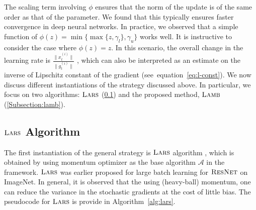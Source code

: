 \documentclass{article} \usepackage{iclr2020_conference,times}
\def\eqref#1{equation~\ref{#1}}
\newcommand{\resnet}{\textsc{ResNet}}
\newcommand{\lamb}{\textsc{Lamb}}
\newcommand{\lars}{\textsc{Lars}}
\begin{document}
The scaling term involving $\phi$ ensures that the norm of the update is of the same order as that of the parameter. We found that this typically ensures faster convergence in deep neural networks. In practice, we observed that a simple function of $\phi(z) = \min\{\max\{z, \gamma_l\}, \gamma_u\}$ works well. It is instructive to consider the case where $\phi(z) = z$. In this scenario, the overall change in the learning rate is $\tfrac{\|x_t^{(i)}\|}{\|g_t^{(i)}\|}$ , which can also be interpreted as an estimate on the inverse of Lipschitz constant of the gradient (see~\eqref{eq:l-const}). We now discuss different instantiations of the strategy discussed above. 
In particular, we focus on two algorithms: $\lars$ (\ref{Subsection:lars}) and the proposed method, $\lamb$ (\ref{Subsection:lamb}).

\subsection{$\lars$ Algorithm}
\label{Subsection:lars}

The first instantiation of the general strategy is $\lars$ algorithm \citep{you2017scaling}, which is obtained by using momentum optimizer as the base algorithm $\mathcal{A}$ in the framework. $\lars$ was earlier proposed for large batch learning for $\resnet$ on ImageNet. In general, it is observed that the using (heavy-ball) momentum, one can reduce the variance in the stochastic gradients at the cost of little bias. The pseudocode for $\lars$ is provide in Algorithm~\ref{alg:lars}.
\end{document}
